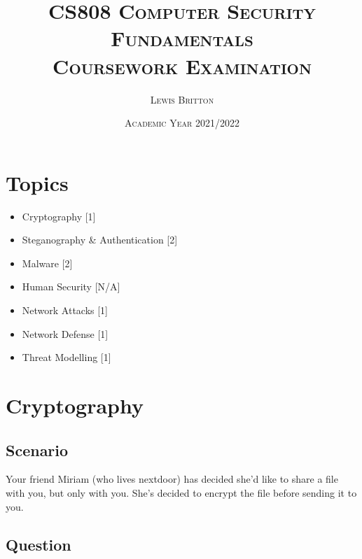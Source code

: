 \documentclass[11pt, english]{article}
\begin{document}

        \title{\textsc{CS808 Computer Security Fundamentals\\ Coursework Examination}}
        \author{\textsc{Lewis Britton}}
        \date{\textsc{Academic Year 2021/2022}}
        \maketitle

\newpage


	\renewcommand{\contentsname}{Table of Contents}

        \tableofcontents

\newpage


\section*{Topics}

	\begin{itemize}
	\setlength\itemsep{0cm}
		\item Cryptography [1]
		\item Steganography \& Authentication [2]
		\item Malware [2]
		\item Human Security [N/A]
		\item Network Attacks [1]
		\item Network Defense [1]
		\item Threat Modelling [1]
	\end{itemize}

\newpage

\section{Cryptography}

	\subsection{Scenario}

	Your friend Miriam (who lives nextdoor) has decided she'd like to share a file with you, but only with you. She's decided to encrypt the file before sending it to you.

	\subsection{Question}
\end{document}

